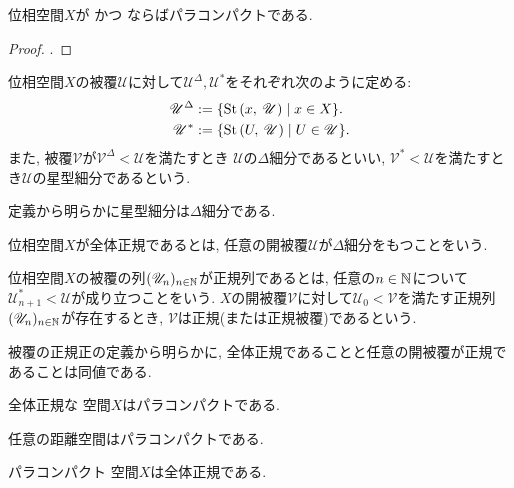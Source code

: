 \documentclass[uplatex, dvipdfmx, a4paper, 12pt, class=jsbook, crop=false]{standalone}
\begin{document}
\begin{theorem}
	位相空間$ X $が  かつ \Lindelof ならばパラコンパクトである.
\end{theorem}
\begin{proof}
	\WIP.
\end{proof}

\begin{definition}
	位相空間$ X $の被覆$ \mathscr{U} $に対して$ \mathscr{U}^\Delta, \mathscr{U}^* $をそれぞれ次のように定める:
	\begin{align*}
		\mathscr{U}^\Delta & \defeq \setcomp{\starset{x}{\mathscr{U}}}{x \in X}. \\
		\mathscr{U}^* & \defeq \setcomp{\starset{U}{\mathscr{U}}}{U \in \mathscr{U}}.
	\end{align*}
	また, 被覆$ \mathscr{V} $が$ \mathscr{V}^\Delta < \mathscr{U} $を満たすとき
	$ \mathscr{U} $の$ \Delta $細分であるといい,
	$ \mathscr{V}^* < \mathscr{U} $を満たすとき$ \mathscr{U} $の星型細分であるという.
\end{definition}
定義から明らかに星型細分は$ \Delta $細分である.

\begin{definition}
	位相空間$ X $が全体正規であるとは, 任意の開被覆$ \mathscr{U} $が$ \Delta $細分をもつことをいう.
\end{definition}

\begin{definition}
	位相空間$ X $の被覆の列$ (\mathscr{U}_n)_{n \in \mathbb{N}} $が正規列であるとは,
	任意の$ n \in \mathbb{N}  $について$ \mathscr{U}_{n+1}^* < \mathscr{U} $が成り立つことをいう.
	$ X $の開被覆$ \mathscr{V} $に対して$ \mathscr{U}_0 < \mathscr{V} $を満たす正規列
	$ (\mathscr{U}_n)_{n \in \mathbb{N}} $が存在するとき,
	$ \mathscr{V} $は正規(または正規被覆)であるという.
\end{definition}

被覆の正規正の定義から明らかに, 全体正規であることと任意の開被覆が正規であることは同値である.

\begin{theorem}
	全体正規な  空間$ X $はパラコンパクトである.
\end{theorem}

\begin{theorem}
	任意の距離空間はパラコンパクトである.
\end{theorem}

\begin{theorem}
	パラコンパクト  空間$ X $は全体正規である.
\end{theorem}
\end{document}
